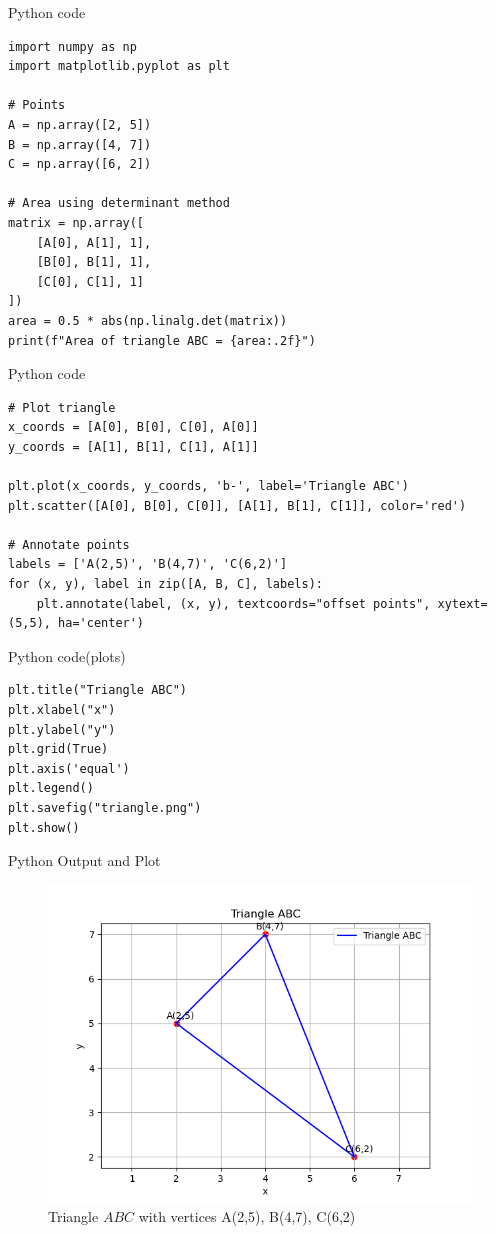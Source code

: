 \documentclass{beamer}
\begin{document}
\begin{frame}[fragile]{Python code}
\begin{lstlisting}
import numpy as np
import matplotlib.pyplot as plt

# Points
A = np.array([2, 5])
B = np.array([4, 7])
C = np.array([6, 2])

# Area using determinant method
matrix = np.array([
    [A[0], A[1], 1],
    [B[0], B[1], 1],
    [C[0], C[1], 1]
])
area = 0.5 * abs(np.linalg.det(matrix))
print(f"Area of triangle ABC = {area:.2f}")
\end{lstlisting}
\end{frame}

\begin{frame}[fragile]{Python code}
\begin{lstlisting}
# Plot triangle
x_coords = [A[0], B[0], C[0], A[0]]
y_coords = [A[1], B[1], C[1], A[1]]

plt.plot(x_coords, y_coords, 'b-', label='Triangle ABC')
plt.scatter([A[0], B[0], C[0]], [A[1], B[1], C[1]], color='red')

# Annotate points
labels = ['A(2,5)', 'B(4,7)', 'C(6,2)']
for (x, y), label in zip([A, B, C], labels):
    plt.annotate(label, (x, y), textcoords="offset points", xytext=(5,5), ha='center')
\end{lstlisting}
\end{frame}

\begin{frame}[fragile]{Python code(plots)}
\begin{lstlisting}
plt.title("Triangle ABC")
plt.xlabel("x")
plt.ylabel("y")
plt.grid(True)
plt.axis('equal')
plt.legend()
plt.savefig("triangle.png")
plt.show()

\end{lstlisting}
\end{frame}

\begin{frame}{Python Output and Plot}
\begin{figure}[h!]
\centering
\includegraphics[width=0.75\columnwidth]{figs/triangle.png}
\caption{Triangle $ABC$ with vertices A(2,5), B(4,7), C(6,2)}
\end{figure}
\end{frame}
\end{document}
